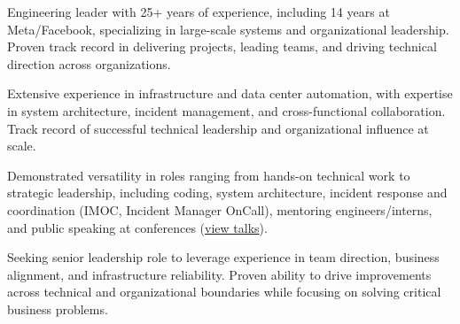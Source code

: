 

\begin{cvparagraph}

    Engineering leader with 25+ years of experience, including 14 years at Meta/Facebook,
    specializing in large-scale systems and organizational leadership. Proven track record
    in delivering projects, leading teams, and driving technical direction across organizations.

    Extensive experience in infrastructure and data center automation,
    with expertise in
    system architecture, incident management, and cross-functional collaboration.
    Track record of successful technical leadership and organizational influence at scale.

    Demonstrated versatility in roles ranging from hands-on technical work to strategic
    leadership, including coding, system architecture, incident response and coordination (IMOC, Incident Manager OnCall),
    mentoring engineers/interns, and public speaking at conferences (\href{https://www.angelofailla.com/public_talks/}{view talks}).

    Seeking senior leadership role to leverage experience in team direction, business alignment,
    and infrastructure reliability. Proven ability to drive improvements across technical
    and organizational boundaries while focusing on solving critical business problems.
\end{cvparagraph}
